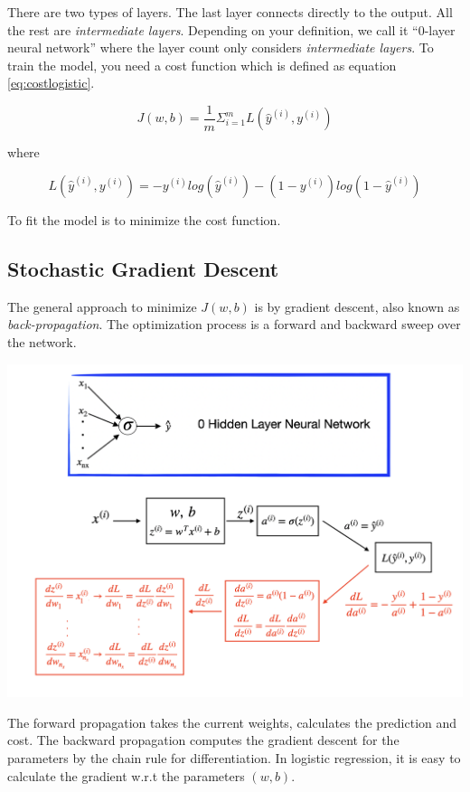 \documentclass[
  12pt,
]{krantz}
\begin{document}
There are two types of layers. The last layer connects directly to the output. All the rest are \emph{intermediate layers}. Depending on your definition, we call it ``0-layer neural network'' where the layer count only considers \emph{intermediate layers}. To train the model, you need a cost function which is defined as equation \eqref{eq:costlogistic}.

\begin{equation}
J(w,b)=\frac{1}{m} \Sigma_{i=1}^m L(\hat{y}^{(i)}, y^{(i)})
\label{eq:costlogistic}
\end{equation}

where

\[L(\hat{y}^{(i)}, y^{(i)}) =  -y^{(i)}log(\hat{y}^{(i)})-(1-y^{(i)})log(1-\hat{y}^{(i)})\]

To fit the model is to minimize the cost function.

\hypertarget{stochastic-gradient-descent}{%
\subsection{Stochastic Gradient Descent}\label{stochastic-gradient-descent}}

The general approach to minimize \(J(w,b)\) is by gradient descent, also known as \emph{back-propagation}. The optimization process is a forward and backward sweep over the network.

\includegraphics[width=1\textwidth,height=\textheight]{images/dnn0_fb3.png}

The forward propagation takes the current weights, calculates the prediction and cost. The backward propagation computes the gradient descent for the parameters by the chain rule for differentiation. In logistic regression, it is easy to calculate the gradient w.r.t the parameters \((w, b)\).
\end{document}
